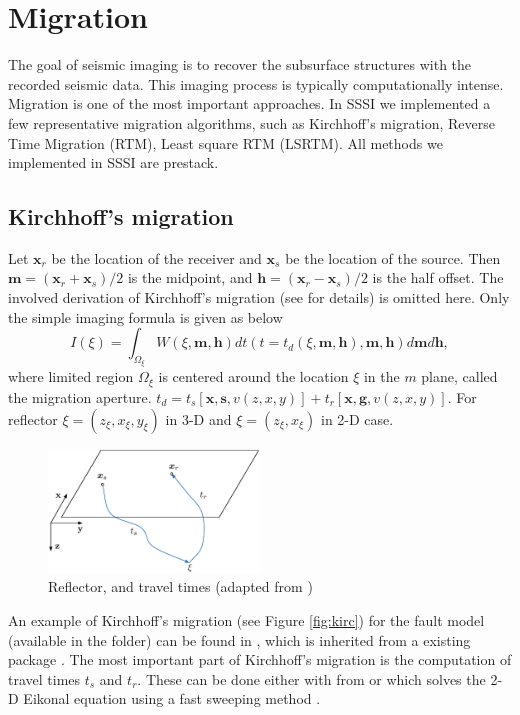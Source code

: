\documentclass[11pt]{article}
\newcommand{\bx}{\boldsymbol{x}}
\newcommand{\bg}{\boldsymbol{g}}
\newcommand{\bh}{\boldsymbol{h}}
\newcommand{\bs}{\boldsymbol{s}}
\newcommand{\bm}{\boldsymbol{m}}
\theoremstyle{plain}
\theoremstyle{definition}
\theoremstyle{remark}
\numberwithin{equation}{section}
\begin{document}
\section{Migration}
The goal of seismic imaging is to recover the subsurface structures with the recorded seismic data. This imaging process is 
typically computationally intense. Migration is one of the most important approaches. In SSSI we implemented a few representative 
migration algorithms, such as
Kirchhoff's migration, Reverse Time Migration (RTM), Least square RTM (LSRTM).
All methods we implemented in SSSI are prestack.  


\subsection{Kirchhoff's migration}
Let $\bx_r$ be the location of the receiver and $\bx_s$ be the location of the source. 
Then $\bm=(\bx_r+\bx_s)/2$ is the midpoint, and $\bh=(\bx_r-\bx_s)/2$ is the half offset.
The involved derivation of Kirchhoff's migration (see \cite{Schneider:1978aa} for details) is omitted here. Only the simple imaging formula 
is given as below
\begin{equation}
\label{eq:kirchhoffImaging}
I(\xi)=\int_{\Omega_\xi} W(\xi,\bm,\bh)dt(t=t_d(\xi,
\bm,\bh),\bm,\bh)d\bm d\bh,
\end{equation}
where limited region $\Omega_\xi$ is centered around the location $\xi$
in the $m$ plane, called the migration aperture. $t_d=t_s[\bx,\bs,v(z,x,y)]+t_r[\bx,\bg,v(z,x,y)]$.
For reflector $\xi = (z_\xi, x_\xi, y_\xi)$ in 3-D and $\xi = (z_\xi, x_\xi)$ in 2-D case.

\begin{figure}[htbp]
\centering
\includegraphics[width=0.5\textwidth]{Fig/tstr}
\caption{Reflector, and travel times (adapted from \cite{Biondi:2006aa})}
\end{figure}
  
An example of Kirchhoff's migration (see Figure \ref{fig:kirc}) for the fault model (available in the  folder) can 
be found in , which is 
inherited from a existing package \cite{Kozola:2011aa}.
The most important part of Kirchhoff's migration is the computation of travel times $t_s$ and $t_r$.   
These can be done either with  from \cite{Kozola:2011aa} or
 which solves the 2-D Eikonal equation using a fast sweeping method \cite{Zhao:2004aa}.
\end{document}
